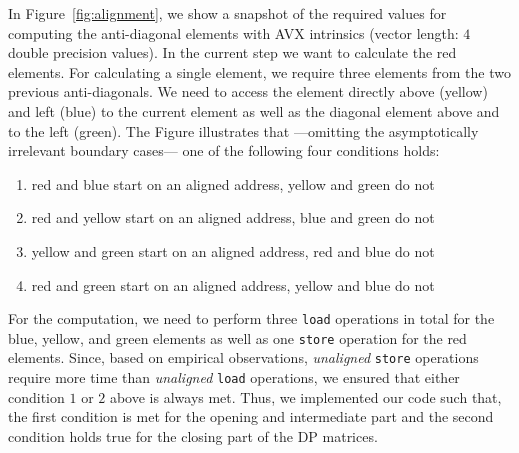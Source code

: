 \documentclass[runningheads,a4paper]{llncs}
\begin{document}
In Figure~\ref{fig:alignment}, we show a snapshot of the required values for computing the anti-diagonal elements with AVX intrinsics (vector length: $4$ double precision values).
In the current step we want to calculate the red elements.
For calculating a single element, we require three elements from the two previous anti-diagonals.
We need to access the element directly above (yellow) and left (blue) to the current element as well as the diagonal element above and to the left  (green).
The Figure illustrates that ---omitting the asymptotically irrelevant boundary cases--- one of the following four conditions holds:
\begin{enumerate}
  \item red and blue start on an aligned address, yellow and green do not
  \item red and yellow start on an aligned address, blue and green do not
  \item yellow and green start on an aligned address, red and blue do not
  \item red and green start on an aligned address, yellow and blue do not
\end{enumerate}

For the computation, we need to perform three \texttt{load} operations in total for the blue, yellow, and green elements as well as one \texttt{store} operation for the red elements.
Since, based on empirical observations, {\em unaligned} \texttt{store} operations require more time than {\em unaligned} \texttt{load} operations,
we ensured that either condition $1$ or $2$ above is always met.
Thus, we implemented our code such that, the first condition is met for the opening and intermediate part and the second condition holds true for the closing part of the DP matrices.


\end{document}
